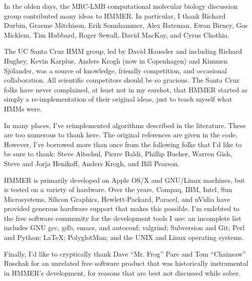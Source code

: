 In the olden days, the MRC-LMB computational molecular biology
discussion group contributed many ideas to HMMER. In particular, I
thank Richard Durbin, Graeme Mitchison, Erik Sonnhammer, Alex Bateman,
Ewan Birney, Gos Micklem, Tim Hubbard, Roger Sewall, David MacKay, and
Cyrus Chothia.

The UC Santa Cruz HMM group, led by David Haussler and including
Richard Hughey, Kevin Karplus, Anders Krogh (now in Copenhagen) and
Kimmen Sj\"{o}lander, was a source of knowledge, friendly competition,
and occasional collaboration. All scientific competitors should be so
gracious. The Santa Cruz folks have never complained, at least not in
my earshot, that HMMER started as simply a re-implementation of their
original ideas, just to teach myself what HMMs were.

In many places, I've reimplemented algorithms described in the
literature. These are too numerous to thank here. The original
references are given in the code. However, I've borrowed more than
once from the following folks that I'd like to be sure to thank: Steve
Altschul, Pierre Baldi, Phillip Bucher, Warren Gish, Steve and Jorja
Henikoff, Anders Krogh, and Bill Pearson.

HMMER is primarily developed on Apple OS/X and GNU/Linux machines, but
is tested on a variety of hardware. Over the years, Compaq, IBM,
Intel, Sun Microsystems, Silicon Graphics, Hewlett-Packard, Paracel,
and nVidia have provided generous hardware support that makes this
possible. I'm endebted to the free software community for the
development tools I use: an incomplete list includes GNU gcc, gdb,
emacs, and autoconf; valgrind; Subversion and Git; Perl and Python;
\LaTeX; PolyglotMan; and the UNIX and Linux operating systems.

Finally, I'd like to cryptically thank Dave ``Mr. Frog'' Pare and Tom
``Chainsaw'' Ruschak for an unrelated free software product that was
historically instrumental in HMMER's development, for reasons that are
best not discussed while sober.


